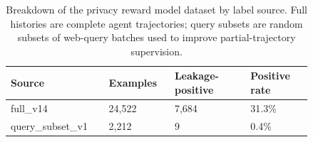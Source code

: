 \begin{table}[t]
\centering
\small
\begin{tabular}{p{0.26\linewidth}p{0.18\linewidth}p{0.22\linewidth}p{0.18\linewidth}}
\toprule
\textbf{Source} & \textbf{Examples} & \textbf{Leakage-positive} & \textbf{Positive rate} \\
\midrule
full\_v14 & 24,522 & 7,684 & 31.3\% \\
query\_subset\_v1 & 2,212 & 9 & 0.4\% \\
\bottomrule
\end{tabular}
\caption{Breakdown of the privacy reward model dataset by label source. Full histories are complete agent trajectories; query subsets are random subsets of web-query batches used to improve partial-trajectory supervision.}
\label{tab:privacy_reward_source_summary}
\end{table}
